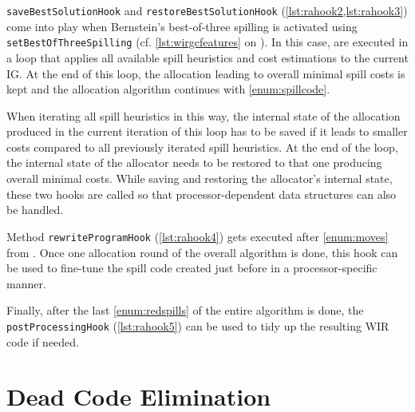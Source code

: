 \texttt{saveBestSolutionHook} and \texttt{restoreBestSolutionHook} (\cref{lst:rahook2,lst:rahook3}) come into play when Bernstein's best-of-three spilling is activated using \texttt{setBestOfThreeSpilling} (cf. \cref{lst:wirgcfeatures} on ).
In this case,  are executed in a loop that applies all available spill heuristics and cost estimations to the current \gls{IG}.
At the end of this loop, the allocation leading to overall minimal spill costs is kept and the allocation algorithm continues with \cref{enum:spillcode}.

When iterating all spill heuristics in this way, the internal state of the allocation produced in the current iteration of this loop has to be saved if it leads to smaller costs compared to all previously iterated spill heuristics.
At the end of the loop, the internal state of the allocator needs to be restored to that one producing overall minimal costs.
While saving and restoring the allocator's internal state, these two hooks are called so that processor-dependent data structures can also be handled.

Method \texttt{rewriteProgramHook} (\cref{lst:rahook4}) gets executed after \cref{enum:moves} from .
Once one allocation round of the overall algorithm is done, this hook can be used to fine-tune the spill code created just before in a processor-specific manner.

Finally, after the last \cref{enum:redspills} of the entire algorithm is done, the \texttt{postProcessingHook} (\cref{lst:rahook5}) can be used to tidy up the resulting \gls{WIR} code if needed.


\section{Dead Code Elimination}
\label{sec:optdceretarget}

